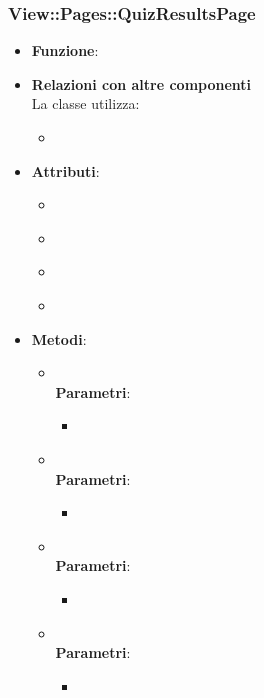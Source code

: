 \subsubsection{View::Pages::QuizResultsPage}
\begin{itemize}
\item\textbf{Funzione}:
\item\textbf{Relazioni con altre componenti}\\
La classe utilizza:
	\begin{itemize}
		\item
	\end{itemize}
\item\textbf{Attributi}:
	\begin{itemize}
		\item\code{}\\
		\item\code{}\\
		\item\code{}\\
		\item\code{}\\
	\end{itemize}
\item\textbf{Metodi}:
	\begin{itemize}
		\item\code{}\\
		\textbf{Parametri}:
			\begin{itemize}
				\item\code{}\\
			\end{itemize}
		\item\code{}\\
		\textbf{Parametri}:
			\begin{itemize}
				\item\code{}\\
			\end{itemize}
		\item\code{}\\
		\textbf{Parametri}:
			\begin{itemize}
				\item\code{}\\
			\end{itemize}
		\item\code{}\\
		\textbf{Parametri}:
			\begin{itemize}
				\item\code{}\\
			\end{itemize}
	\end{itemize}
\end{itemize}


